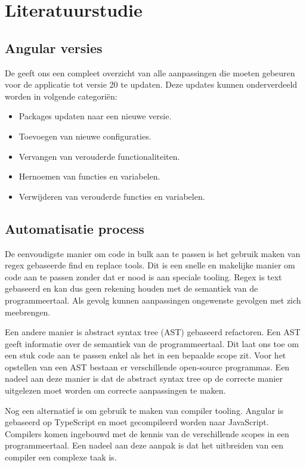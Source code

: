 \section{Literatuurstudie}
\label{sec:literatuurstudie}

\subsection{Angular versies}

De \textcite{Angular update guide} geeft ons een compleet overzicht van alle aanpassingen die moeten gebeuren voor de applicatie tot versie 20 te updaten. Deze updates kunnen onderverdeeld worden in volgende categoriën:

\begin{itemize}\label{categories}
  \item Packages updaten naar een nieuwe versie.
  \item Toevoegen van nieuwe configuraties.
  \item Vervangen van verouderde functionaliteiten. 
  \item Hernoemen van functies en variabelen.
  \item Verwijderen van verouderde functies en variabelen.
\end{itemize}


\subsection{Automatisatie process}

De eenvoudigste manier om code in bulk aan te passen is het gebruik maken van regex gebaseerde find en replace tools.
Dit is een snelle en makelijke manier om code aan te passen zonder dat er nood is aan speciale tooling.
Regex is text gebaseerd en kan dus geen rekening houden met de semantiek van de programmeertaal.
Als gevolg kunnen aanpassingen ongewenste gevolgen met zich meebrengen.

Een andere manier is abstract syntax tree (AST) gebaseerd refactoren.
Een AST geeft informatie over de semantiek van de programmeertaal.
Dit laat ons toe om een stuk code aan te passen enkel als het in een bepaalde scope zit.
Voor het opstellen van een AST bestaan er verschillende open-source programmas.
Een nadeel aan deze manier is dat de abstract syntax tree op de correcte manier uitgelezen moet worden om correcte aanpassingen te maken.

Nog een alternatief is om gebruik te maken van compiler tooling.
Angular is gebaseerd op TypeScript en moet gecompileerd worden naar JavaScript.
Compilers komen ingebouwd met de kennis van de verschillende scopes in een programmeertaal.
Een nadeel aan deze aanpak is dat het uitbreiden van een compiler een complexe taak is.

